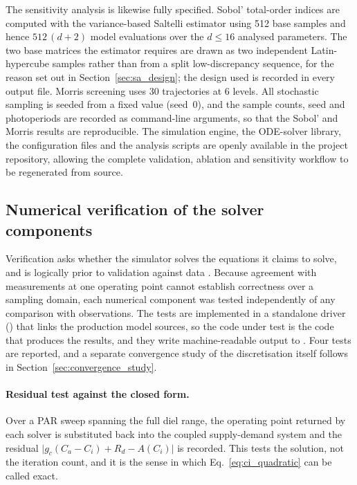 \documentclass[a4paper,fleqn]{cas-sc}
\begin{document}
The sensitivity analysis is likewise fully specified. Sobol' total-order indices
are computed with the variance-based Saltelli estimator
\cite{Saltelli2010} using 512 base samples and hence $512\,(d+2)$ model
evaluations over the $d\le 16$ analysed parameters. The two base matrices the
estimator requires are drawn as two independent Latin-hypercube samples rather
than from a split low-discrepancy sequence, for the reason set out in
Section~\ref{sec:sa_design}; the design used is recorded in every output file.
Morris screening uses 30 trajectories at 6 levels. All stochastic sampling is
seeded from a fixed value (seed~0), and the sample counts, seed and photoperiods
are recorded as command-line arguments, so that the Sobol' and Morris results are
reproducible. The simulation engine, the ODE-solver library, the
configuration files and the analysis scripts are openly available in the project
repository, allowing the complete validation, ablation and sensitivity workflow
to be regenerated from source.

\subsection{Numerical verification of the solver components}
\label{sec:verification}

Verification asks whether the simulator solves the equations it claims to
solve, and is logically prior to validation against data
\citep{Zeigler2000,Cellier1991}. Because agreement with measurements at one
operating point cannot establish correctness over a sampling domain, each
numerical component was tested independently of any comparison with
observations. The tests are implemented in a standalone driver
() that links the production model
sources, so the code under test is the code that produces the results, and
they write machine-readable output to
. Four tests are reported, and a separate
convergence study of the discretisation itself follows in
Section~\ref{sec:convergence_study}.

\paragraph{Residual test against the closed form.}
Over a PAR sweep spanning the full diel range, the operating point returned
by each solver is substituted back into the coupled supply-demand system
and the residual $\bigl|g_c(C_a-C_i) + R_d - A(C_i)\bigr|$ is recorded.
This tests the solution, not the iteration count, and it is the sense in
which Eq.~\eqref{eq:ci_quadratic} can be called exact.
\end{document}
